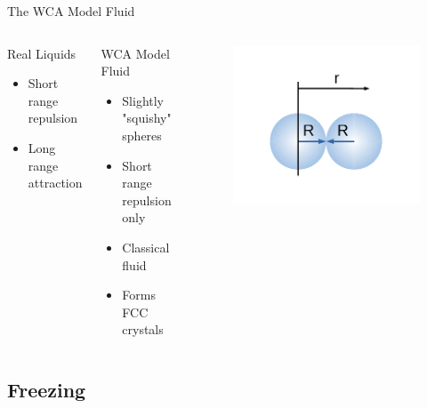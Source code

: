\documentclass{beamer}
\begin{document}
\begin{frame}{The WCA Model Fluid}
\begin{columns}[t]
\begin{block}{Real Liquids}
\begin{itemize}
			    understand real fluids
				\item Short range repulsion 
				\item Long range attraction 
			\end{itemize}
		\end{block}
		\begin{block}{WCA Model Fluid}
			\begin{itemize}
			    \item Slightly "squishy" spheres
				\item Short range repulsion only
				\item Classical fluid
				\item Forms FCC crystals				
			\end{itemize}
		\end{block}		
		\vspace{-3em}
          \begin{figure}
             \centering
             \includegraphics[width=1.1\columnwidth]{figs/TwoSpheresandplot.pdf} 
          \end{figure} 	 
	\end{columns}	
\end{frame}

\subsection*{Freezing}
\end{document}

